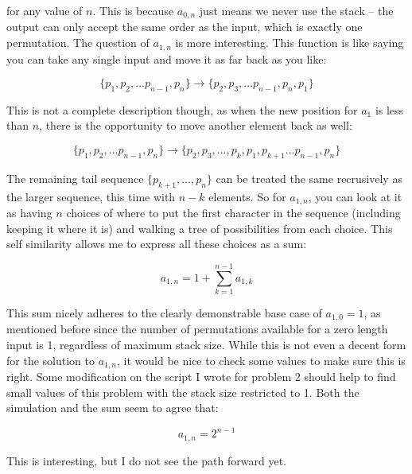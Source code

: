 \documentclass{article}
\begin{document}
for any value of $n$.  This is because $a_{0,n}$ just means we never use the stack -- the output can only accept the same order as the input, which is exactly one permutation.  The question of $a_{1,n}$ is more interesting.  This function is like saying you can take any single input and move it as far back as you like:

\begin{equation*}
  \{ p_1,p_2,...p_{n-1},p_{n} \}
  \rightarrow
  \{ p_2,p_3,...p_{n-1},p_{n},p_{1} \}
\end{equation*}

This is not a complete description though, as when the new position for $a_1$ is less than $n$, there is the opportunity to move another element back as well:

\begin{equation*}
  \{ p_1,p_2,...p_{n-1},p_{n} \}
  \rightarrow
  \{ p_2,p_3,...,p_k,p_1,p_{k+1}...p_{n-1},p_{n} \}
\end{equation*}

The remaining tail sequence $\{p_{k+1},...,p_n\}$ can be treated the same recrusively as the larger sequence, this time with $n - k$ elements. So for $a_{1,n}$, you can look at it as having $n$ choices of where to put the first character in the sequence (including keeping it where it is) and walking a tree of possibilities from each choice.  This self similarity allows me to express all these choices as a sum:

\begin{equation}
  a_{1,n} = 1 + \sum_{k=1}^{n-1} a_{1,k}
\end{equation}

This sum nicely adheres to the clearly demonstrable base case of $a_{1,0} = 1$, as mentioned before since the number of permutations available for a zero length input is 1, regardless of maximum stack size.  While this is not even a decent form for the solution to $a_{1,n}$, it would be nice to check some values to make sure this is right.  Some modification on the script I wrote for problem 2 should help to find small values of this problem with the stack size restricted to 1.  Both the simulation and the sum seem to agree that:

\begin{equation*}
  a_{1,n} = 2^{n -1}
\end{equation*}

\par

This is interesting, but I do not see the path forward yet.
\end{document}
